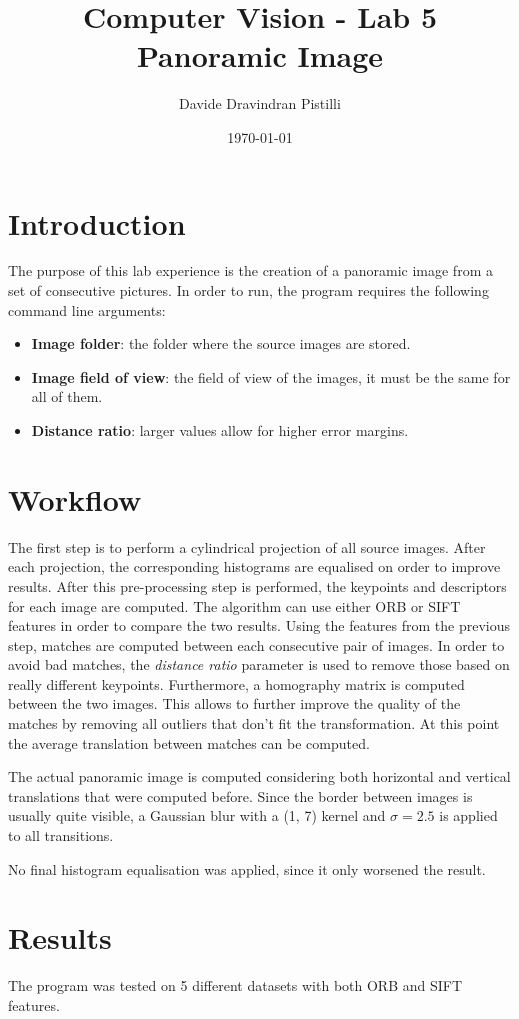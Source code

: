 \documentclass{article}
\title{Computer Vision - Lab 5 \\ Panoramic Image} %
\author{Davide Dravindran Pistilli} %
\date{\today} %
\begin{document}
\maketitle %

\section{Introduction}
The purpose of this lab experience is the creation of a panoramic image from a set of consecutive pictures.
In order to run, the program requires the following command line arguments:
\begin{itemize}
\item \textbf{Image folder}: the folder where the source images are stored.
\item \textbf{Image field of view}: the field of view of the images, it must be the same for all of them.
\item \textbf{Distance ratio}: larger values allow for higher error margins.
\end{itemize}

\section{Workflow}
The first step is to perform a cylindrical projection of all source images. After each projection, the corresponding histograms are equalised on order to improve results.
After this pre-processing step is performed, the keypoints and descriptors for each image are computed. The algorithm can use either ORB or SIFT features in order to compare the two results.
Using the features from the previous step, matches are computed between each consecutive pair of images. In order to avoid bad matches, the \textit{distance ratio} parameter is used to remove those based on really different keypoints.
Furthermore, a homography matrix is computed between the two images. This allows to further improve the quality of the matches by removing all outliers that don't fit the transformation.
At this point the average translation between matches can be computed.

The actual panoramic image is computed considering both horizontal and vertical translations that were computed before. Since the border between images is usually quite visible, a Gaussian blur with a (1, 7) kernel and $\sigma=2.5$ is applied to all transitions.

No final histogram equalisation was applied, since it only worsened the result.

\section{Results}
The program was tested on 5 different datasets with both ORB and SIFT features.


\end{document}

